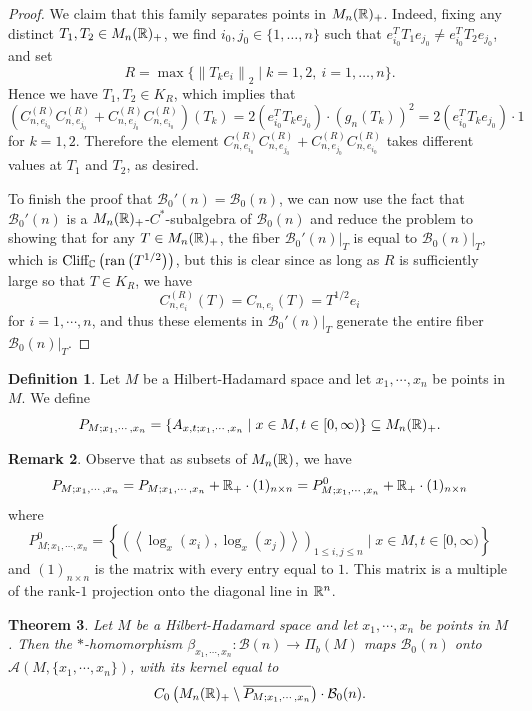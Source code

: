 \documentclass[11pt]{article}
\theoremstyle{definition}
\newtheorem{Def}{Definition}[section]
\newtheorem{Rem}[Def]{Remark}
\theoremstyle{plain}
\newtheorem{Thm}[Def]{Theorem}
\def\A{\mathcal A}\def\C{\mathcal C}\def\B{\mathcal B}\def\E{\mathcal E}\def\O{\mathcal O}\def\h{\mathfrak h}\def\K{\mathcal K}\def\F{\mathcal F}\def\P{\mathcal P}\def\L{\mathcal L}\def\R{\mathcal R}\def\Q{\mathcal Q}\def\H{\mathcal H}\def\S{\mathcal S}\def\N{\mathcal N}\def\U{\mathcal U}\def\V{\mathcal V}
\def\Cl{\textup{Cliff}_{\IC}}
\begin{document}
\begin{proof}
We claim that this family separates points in $M_n(\mathbb R)_{+}$. Indeed, fixing any distinct $T_1, T_2 \in M_n(\mathbb R)_{+}$, we find $i_0, j_0 \in \{1, \ldots, n\}$ such that $e_{i_0}^{T} T_1 e_{j_0} \not= e_{i_0}^{T}T_2 e_{j_0}$, and set 
\[R = \max\{ \left\| T_k e_i \right\|_2 \mid k =1,2, \ i = 1, \ldots, n \}.\]
Hence we have $T_1, T_2 \in K_R$, which implies that 
\[\left( C_{n, e_{i_0}}^{(R)} C_{n, e_{j_0}}^{(R)} + C_{n, e_{j_0}}^{(R)} C_{n, e_{i_0}}^{(R)} \right) (T_k) = 2 \left( e_{i_0}^{T} T_k e_{j_0} \right) \cdot \left( g_n (T_k) \right)^2 = 2 \left( e_{i_0}^{T}T_k e_{j_0} \right) \cdot 1\]
for $k=1,2$. Therefore the element $C_{n, e_{i_0}}^{(R)} C_{n, e_{j_0}}^{(R)} + C_{n, e_{j_0}}^{(R)} C_{n, e_{i_0}}^{(R)}$ takes different values at $T_1$ and $T_2$, as desired. 
	
To finish the proof that $\B_0'(n) = \B_0(n)$, we can now use the fact that $\B_0'(n)$ is a $M_n(\mathbb R)_{+}$-$C^*$-subalgebra of $\B_0(n)$ and reduce the problem to showing that for any $T \in M_n(\mathbb R)_{+}$, the fiber $\B_0'(n)|_T$ is equal to $\B_0(n)|_T$, which is $\Cl\left(\operatorname{ran}\left({T}^{1/2}\right)\right)$, but this is clear since as long as $R$ is sufficiently large so that $T \in K_R$, we have
\[C_{n, e_{i}}^{(R)} (T) = C_{n, e_{i}} (T) = T^{1/2} e_{i}\]
for $i = 1, \cdots, n$, and thus these elements in $\B_0'(n)|_T$ generate the entire fiber $\B_0(n)|_T$.
\end{proof}

\begin{Def}
Let $M$ be a Hilbert-Hadamard space and let $x_1, \cdots, x_n$ be points in $M$. We define 
\[P_{M;x_1, \cdots, x_n} = \{ A_{x,t; x_1, \cdots, x_n} \mid x \in M, t \in [0,\infty) \} \subseteq M_n(\mathbb R)_{+}.\]
\end{Def}

\begin{Rem}
Observe that as subsets of $M_n(\mathbb R)$, we have
\[P_{M;x_1, \cdots, x_n} = P_{M;x_1, \cdots, x_n} + \mathbb R_{+} \cdot (1)_{n \times n} = P_{M;x_1, \cdots, x_n}^0 + \mathbb R_{+} \cdot (1)_{n \times n}\]	
where 
\[P_{M;x_1, \cdots, x_n}^0 = \left\{ \left( \left\langle \log_x \left( x_i \right), \log_x \left( x_j \right) \right\rangle \right)_{1 \leq i,j \leq n}  \mid x \in M, t \in [0,\infty) \right\}\]
and $(1)_{n \times n}$ is the matrix with every entry equal to $1$. This matrix is a multiple of the rank-$1$ projection onto the diagonal line in $\mathbb R^n$. 
\end{Rem}

\begin{Thm}
Let $M$ be a Hilbert-Hadamard space and let $x_1, \cdots, x_n$ be points in $M$. Then the $*$-homomorphism $\beta_{x_1, \cdots, x_n}:\B(n) \to \Pi_b(M)$ maps $\B_0(n)$ onto $\A(M,\{x_1, \cdots, x_n\})$, with its kernel equal to 
\[C_0 \left(M_n(\IR)_{+} \setminus \overline{P_{M;x_1, \cdots, x_n}} \right) \cdot \B_0(n).\]
\end{Thm}
\end{document}
